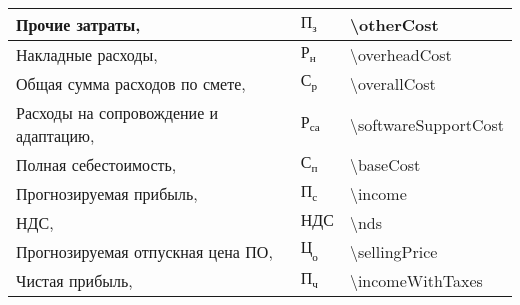 \begin{table}[!h!t]
\begin{tabular}{| >{\raggedright}m{} 
                  | >{\centering}m{} 
                  | >{\centering\arraybackslash}m{}|}
    \hline
    Прочие затраты, \byr{} & $ \text{П}_\text{з} $ & \num{\otherCost} \\

    \hline
    Накладные расходы, \byr{} & $ \text{Р}_\text{н} $ & \num{\overheadCost} \\

    \hline
    Общая сумма расходов по смете, \byr{} & $ \text{С}_\text{р} $ & \num{\overallCost} \\

    \hline
    Расходы на сопровождение и адаптацию, \byr{} & $ \text{Р}_\text{са} $ & \num{\softwareSupportCost} \\

    \hline
    Полная себестоимость, \byr{} & $ \text{С}_\text{п} $ & \num{\baseCost} \\

    \hline
    Прогнозируемая прибыль, \byr{} & $ \text{П}_\text{с} $ & \num{\income} \\

    \hline
    НДС, \byr{} & $ \text{НДС} $ & \num{\nds} \\

    \hline
    Прогнозируемая отпускная цена ПО, \byr{} & $ \text{Ц}_\text{о} $ & \num{\sellingPrice} \\

    \hline
    Чистая прибыль, \byr{} & $ \text{П}_\text{ч} $ & \num{\incomeWithTaxes} \\

    \hline
  \end{tabular}
\end{table}
\hfill
\clearpage


